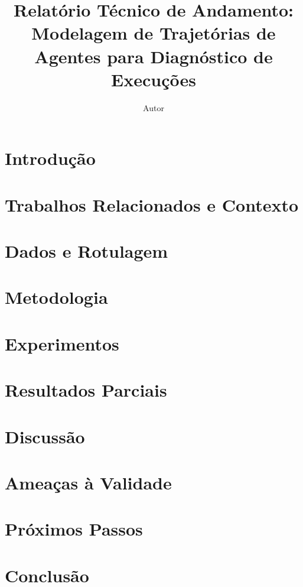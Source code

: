 \documentclass[sigconf,review,anonymous,nonacm]{acmart}
\title[Modelagem de Trajetórias de Agentes]{Relatório Técnico de Andamento: Modelagem de Trajetórias de Agentes para Diagnóstico de Execuções}
\author{Autor}
\affiliation{%
  \institution{Sistemas Computacionais Aplicados}
  \country{Brasil}
}
\begin{document}
\begin{abstract}

\end{abstract}


\maketitle

\section{Introdução}


\section{Trabalhos Relacionados e Contexto}


\section{Dados e Rotulagem}


\section{Metodologia}


\section{Experimentos}


\section{Resultados Parciais}


\section{Discussão}


\section{Ameaças à Validade}


\section{Próximos Passos}


\section{Conclusão}




\end{document}
